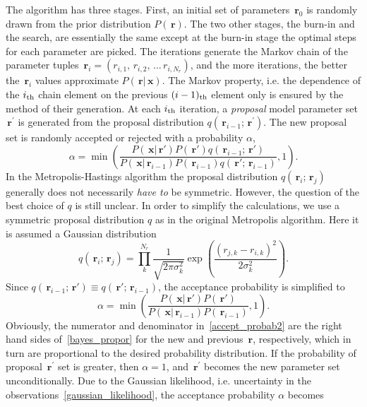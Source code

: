 \documentclass[preprint2]{aastex}
\newcommand{\bfr}{\,\mathbf{r}}
\newcommand{\bfx}{\,\mathbf{x}}
\begin{document}
The algorithm has three stages. First, an initial set of parameters $\bfr_0$ is randomly drawn from the prior distribution $P(\bfr)$. The two other stages, the burn-in and the search, are essentially the same except at the burn-in stage the optimal steps for each parameter are picked. The iterations generate the Markov chain of the parameter tuples $\bfr_i = \left(r_{i,1},\, r_{i,2},\, ...\, r_{i,N_r} \right)$, and the more iterations, the better the $\bfr_i$ values approximate $P(\bfr|\bfx)$. The Markov property, i.e. the dependence of the $i_{\rm th}$ chain element on the previous $(i-1)_{\rm th}$ element only is ensured by the method of their generation. At each $i_{\rm th}$ iteration, a \emph{proposal} model parameter set $\bfr^\prime$ is generated from the proposal distribution $q(\bfr_{i-1};\bfr^\prime)$. The new proposal set is randomly accepted or rejected with a probability $\alpha$,
\begin{equation}
  \label{accept_probab}
  \alpha =  \min \left( \frac{P(\bfx|\bfr')P(\bfr')q(\bfr_{i-1};\bfr')} 
            {P(\bfx|\bfr_{i-1})P(\bfr_{i-1})q(\bfr';\bfr_{i-1})}, 1 \right).
\end{equation}
In the Metropolis-Hastings algorithm the proposal distribution $q(\bfr_i;\bfr_j)$ generally does not necessarily \emph{have to} be symmetric. However, the question of the best choice of $q$ is still unclear. In order to simplify the calculations, we use a symmetric proposal distribution $q$ as in the original Metropolis algorithm. Here it is  assumed a Gaussian distribution
\begin{equation}
  \label{gaussian_prop_distr}
  q(\bfr_i;\bfr_j) = \prod^{N_r}_{k} \frac{1}{\sqrt{2 \pi \sigma^2_k}} 
                   \exp \left( \frac{(r_{j,k} - r_{i,k})^2}{2 \sigma^2_k} \right).
\end{equation}
Since $q(\bfr_{i-1};\bfr') \equiv q(\bfr';\bfr_{i-1})$, the acceptance probability is simplified to
\begin{equation}
  \label{accept_probab2}
  \alpha =  \min \left( \frac{P(\bfx|\bfr')P(\bfr')} {P(\bfx|\bfr_{i-1})P(\bfr_{i-1})}, 1 \right).
\end{equation}
Obviously, the numerator and denominator in~\eqref{accept_probab2} are the right hand sides of~\eqref{bayes_propor} for the new and previous $\bfr$, respectively, which in turn are proportional to the desired probability distribution. If the probability of proposal $\bfr^\prime$ set is greater, then $\alpha = 1$, and $\bfr^\prime$ becomes the new parameter set unconditionally. Due to the Gaussian likelihood, i.e. uncertainty in the observations~\eqref{gaussian_likelihood}, the acceptance probability $\alpha$ becomes
\end{document}
